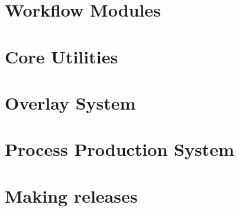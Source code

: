 \documentclass[a4paper,12pt]{article}
\begin{document}
\section{Workflow Modules}

\section{Core Utilities}

\section{Overlay System}

\section{Process Production System}

\section{Making releases}
\end{document}
